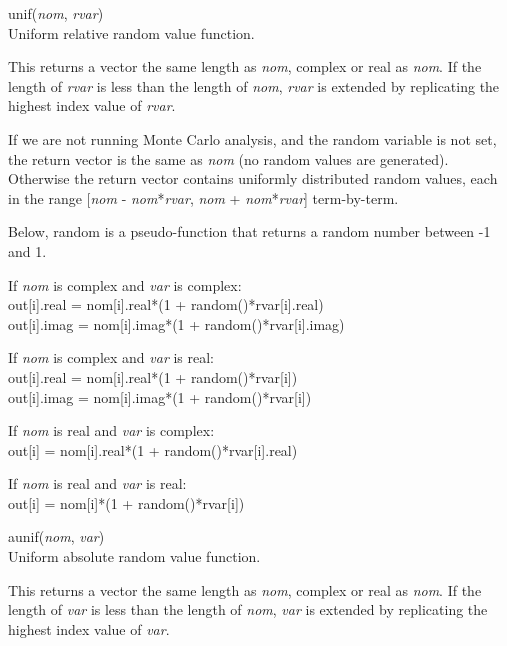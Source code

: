 \begin{description}
\item{\vt unif}({\it nom\/}, {\it rvar\/})\\
Uniform relative random value function.

This returns a vector the same length as {\it nom}, complex or real as
{\it nom}.  If the length of {\it rvar} is less than the length of
{\it nom}, {\it rvar} is extended by replicating the highest index
value of {\it rvar}.

If we are not running Monte Carlo analysis, and the {\et random}
variable is not set, the return vector is the same as {\it nom} (no
random values are generated).  Otherwise the return vector contains
uniformly distributed random values, each in the range [{\it nom} -
{\it nom\/}*{\it rvar\/}, {\it nom} + {\it nom\/}*{\it rvar\/}]
term-by-term.

Below, {\vt random} is a pseudo-function that returns a random number
between -1 and 1.

\begin{description}
\item{If {\it nom} is complex and {\it var} is complex:}\\
  {\vt out[i].real = nom[i].real*(1 + random()*rvar[i].real)}\\
  {\vt out[i].imag = nom[i].imag*(1 + random()*rvar[i].imag)}

\item{If {\it nom} is complex and {\it var} is real:}\\
  {\vt out[i].real = nom[i].real*(1 + random()*rvar[i])}\\
  {\vt out[i].imag = nom[i].imag*(1 + random()*rvar[i])}

\item{If {\it nom} is real and {\it var} is complex:}\\
  {\vt out[i] = nom[i].real*(1 + random()*rvar[i].real)}

\item{If {\it nom} is real and {\it var} is real:}\\
  {\vt out[i] = nom[i]*(1 + random()*rvar[i])}
\end{description}

\item{\vt aunif}({\it nom\/}, {\it var\/})\\
Uniform absolute random value function.

This returns a vector the same length as {\it nom\/}, complex or real
as {\it nom\/}.  If the length of {\it var} is less than the length of
{\it nom\/}, {\it var} is extended by replicating the highest index
value of {\it var\/}.


\end{description}
